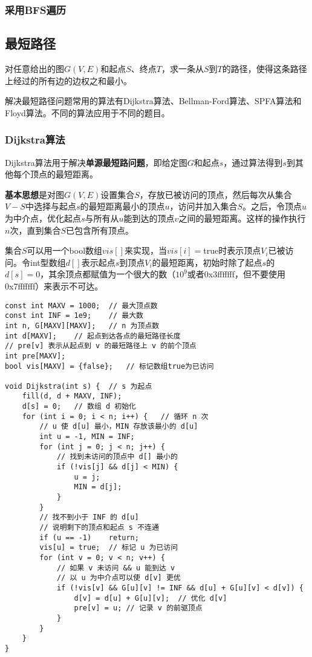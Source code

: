 \subsubsection{采用BFS遍历}


\subsection{最短路径}

对任意给出的图$G(V,E)$和起点$S$、终点$T$，求一条从$S$到$T$的路径，使得这条路径上经过的所有边的边权之和最小。

解决最短路径问题常用的算法有Dijkstra算法、Bellman-Ford算法、SPFA算法和Floyd算法。不同的算法应用于不同的题目。

\subsubsection{Dijkstra算法}

Dijkstra算法用于解决\textbf{单源最短路问题}，即给定图$G$和起点$s$，通过算法得到$s$到其他每个顶点的最短距离。

\textbf{基本思想}是对图$G(V,E)$设置集合$S$，存放已被访问的顶点，然后每次从集合$V-S$中选择与起点$s$的最短距离最小的顶点$u$，访问并加入集合$S$。之后，令顶点$u$为中介点，优化起点$s$与所有从$u$能到达的顶点$v$之间的最短距离。这样的操作执行$n$次，直到集合$S$已包含所有顶点。

集合$S$可以用一个bool数组$vis[]$来实现，当$vis[i]=$true时表示顶点$ V_i $已被访问。令int型数组$d[]$表示起点$s$到顶点$V_i$的最短距离，初始时除了起点$s$的$d[s]=0$，其余顶点都赋值为一个很大的数（$10^9$或者0x3fffffff，但不要使用0x7fffffff）来表示不可达。

\begin{lstlisting}
const int MAXV = 1000;	// 最大顶点数
const int INF = 1e9;	// 最大数
int n, G[MAXV][MAXV];	// n 为顶点数
int d[MAXV];	// 起点到达各点的最短路径长度
// pre[v] 表示从起点到 v 的最短路径上 v 的前个顶点
int pre[MAXV];
bool vis[MAXV] = {false};	// 标记数组true为已访问

void Dijkstra(int s) {	// s 为起点
	fill(d, d + MAXV, INF);
	d[s] = 0;	// 数组 d 初始化
	for (int i = 0; i < n; i++)	{	// 循环 n 次
		// u 使 d[u] 最小，MIN 存放该最小的 d[u]
		int u = -1, MIN = INF;
		for (int j = 0; j < n; j++) {
			// 找到未访问的顶点中 d[] 最小的
			if (!vis[j] && d[j] < MIN) {
				u = j;
				MIN = d[j];
			}
		}
		// 找不到小于 INF 的 d[u]
		// 说明剩下的顶点和起点 s 不连通
		if (u == -1)	return;
		vis[u] = true;	// 标记 u 为已访问
		for (int v = 0; v < n; v++) {
			// 如果 v 未访问 && u 能到达 v
			// 以 u 为中介点可以使 d[v] 更优
			if (!vis[v] && G[u][v] != INF && d[u] + G[u][v] < d[v]) {
				d[v] = d[u] + G[u][v];	// 优化 d[v]
				pre[v] = u;	// 记录 v 的前驱顶点
			}
		}
	}
}
\end{lstlisting}

